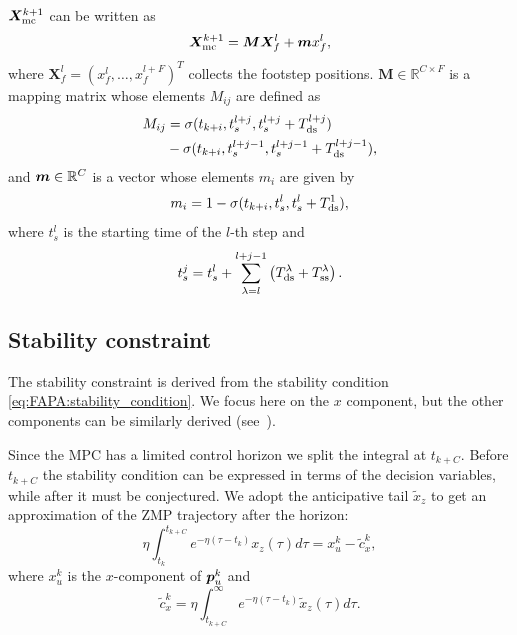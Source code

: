 $\bm{X}_{\rm mc}^{k+1}$ can be written as
\begin{equation}
\label{eq:FAPA:mapping}
\bm{X}_{\rm mc}^{k+1} = \bm{M} \bm{X}_f^l + \bm{m}x_f^l,
\end{equation}
where $\bm{X}_{f}^{l} = (x_{f}^{l}, \dots, x_{f}^{l+F})^T$ collects the footstep positions. $\bm{M}\in\mathbb{R}^{C\times F}$ is a mapping matrix whose elements $M_{ij}$ are defined as
\begin{equation}\begin{split}
M_{ij} &= \sigma(t_{k+i}, t_s^{l+j},t_s^{l+j}+T_{\rm ds}^{l+j})\\ &- \sigma(t_{k+i}, t_s^{l+j-1},t_s^{l+j-1}+T_{\rm ds}^{l+j-1}),
\end{split}\end{equation}
and ${\bm{m}}\in\mathbb{R}^{C}$ is a vector whose elements $m_i$ are given by
\begin{equation*}
m_{i} = 1 - \sigma(t_{k+i}, t_s^{l},t_s^{l}+T_{\rm ds}^{1}),
\end{equation*}
where $t_s^l$ is the starting time of the $l$-th step and
\begin{equation*}
    t^j_s = t^l_s + \sum^{l+j-1}_{\lambda=l} \left(T_{\rm ds}^\lambda + T_{\rm ss}^\lambda\right).
\end{equation*}

\subsection{Stability constraint}

The stability constraint is derived from the stability condition \eqref{eq:FAPA:stability_condition}. We focus here on the $x$ component, but the other components can be similarly derived (see~\cite{Cipriano2023RAS}).

Since the MPC has a limited control horizon we split the integral at $t_{k+C}$. Before $t_{k+C}$ the stability condition can be expressed in terms of the decision variables, while after it must be conjectured. We adopt the anticipative tail $\tilde x_z$ \cite{ScDeLaOr:20} to get an approximation of the ZMP trajectory after the horizon:
\begin{equation*}
    \eta \int_{t_k}^{t_{k+C}} e^{-\eta(\tau-t_k)} x_z(\tau) d\tau = x_u^k - \tilde{c}_x^k,
\end{equation*}
where $x_u^k$ is the $x$-component of ${\bm{p}}_u^k$ and
\begin{equation*}
    \tilde{c}_x^k = \eta \int_{t_{k+C}}^{\infty} e^{-\eta(\tau-t_k)} \tilde{x}_z(\tau) d\tau.
\end{equation*}

